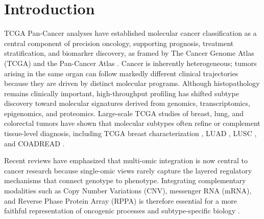 \documentclass[lettersize,journal]{IEEEtran}
\begin{document}

\section{Introduction}
\label{sec:introduction}
 TCGA Pan-Cancer analyses have established molecular cancer classification as a central component of precision oncology, supporting prognosis, treatment stratification, and biomarker discovery, as framed by The Cancer Genome Atlas (TCGA) \cite{TCGA2013} and the Pan-Cancer Atlas \cite{Hoadley2018PanCancer}. Cancer is inherently heterogeneous; tumors arising in the same organ can follow markedly different clinical trajectories because they are driven by distinct molecular programs. Although histopathology remains clinically important, high-throughput profiling has shifted subtype discovery toward molecular signatures derived from genomics, transcriptomics, epigenomics, and proteomics. Large-scale TCGA studies of breast, lung, and colorectal tumors have shown that molecular subtypes often refine or complement tissue-level diagnosis, including TCGA breast characterization \cite{Koboldt2012BRCA}, LUAD \cite{TCGA2014LUAD}, LUSC \cite{TCGA2012LUSC}, and COADREAD \cite{TCGA2012COADREAD}. 

Recent reviews \cite{Cai2022Review, CarrilloPerez2022, Abdelaziz2024Review, Han2025Review} have emphasized that multi-omic integration is now central to cancer research because single-omic views rarely capture the layered regulatory mechanisms that connect genotype to phenotype. Integrating complementary modalities such as Copy Number Variations (CNV), messenger RNA (mRNA), and Reverse Phase Protein Array (RPPA) is therefore essential for a more faithful representation of oncogenic processes and subtype-specific biology \cite{CrossAttOmics2024, Omran2025}. 
\end{document}
